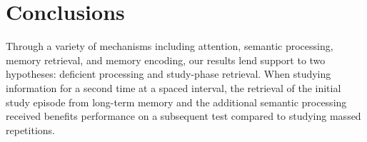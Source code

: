 

\section{Conclusions}

Through a variety of mechanisms including attention, semantic processing, memory retrieval, and memory encoding, our results lend support to two hypotheses: deficient processing and study-phase retrieval.  When studying information for a second time at a spaced interval, the retrieval of the initial study episode from long-term memory and the additional semantic processing received benefits performance on a subsequent test compared to studying massed repetitions.





